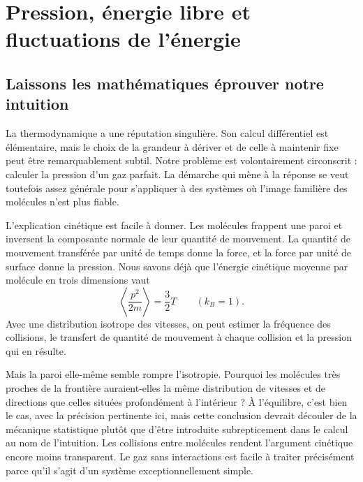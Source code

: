 \chapter{Pression, énergie libre et fluctuations de l’énergie}


\section{Laissons les mathématiques éprouver notre intuition}

La thermodynamique a une réputation singulière. Son calcul différentiel est élémentaire, mais le choix de la grandeur à dériver et de celle à maintenir fixe peut être remarquablement subtil. Notre problème est volontairement circonscrit : calculer la pression d’un gaz parfait. La démarche qui mène à la réponse se veut toutefois assez générale pour s’appliquer à des systèmes où l’image familière des molécules n’est plus fiable.

L’explication cinétique est facile à donner. Les molécules frappent une paroi et inversent la composante normale de leur quantité de mouvement. La quantité de mouvement transférée par unité de temps donne la force, et la force par unité de surface donne la pression. Nous savons déjà que l’énergie cinétique moyenne par molécule en trois dimensions vaut \begin{equation}
 \left\langle \frac{p^2}{2m}\right\rangle=\frac{3}{2}T
 \qquad (k_B=1).
 \label{eq:sm5-mean-kinetic-energy}
\end{equation}Avec une distribution isotrope des vitesses, on peut estimer la fréquence des collisions, le transfert de quantité de mouvement à chaque collision et la pression qui en résulte.

Mais la paroi elle-même semble rompre l’isotropie. Pourquoi les molécules très proches de la frontière auraient-elles la même distribution de vitesses et de directions que celles situées profondément à l’intérieur ? À l’équilibre, c’est bien le cas, avec la précision pertinente ici, mais cette conclusion devrait découler de la mécanique statistique plutôt que d’être introduite subrepticement dans le calcul au nom de l’intuition. Les collisions entre molécules rendent l’argument cinétique encore moins transparent. Le gaz sans interactions est facile à traiter précisément parce qu’il s’agit d’un système exceptionnellement simple.

